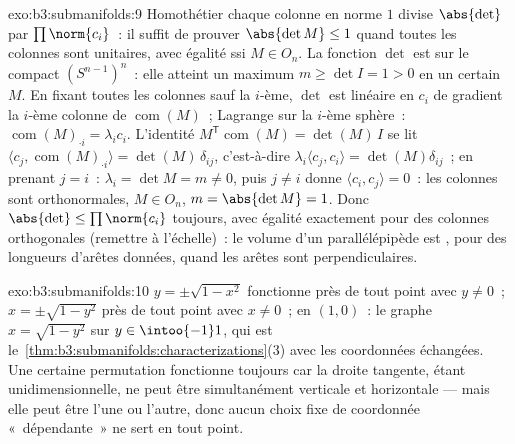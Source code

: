 \begin{solution}{exo:b3:submanifolds:9}
Homothétier chaque colonne en norme $1$ divise $\abs{\det}$
par $\prod\norm{c_i}$~: il suffit de prouver $\abs{\det M}
\leq 1$ quand toutes les colonnes sont unitaires, avec
égalité ssi $M \in O_n$. La fonction $\det$ est  sur
le compact $(S^{n-1})^n$~: elle atteint un maximum $m \geq
\det I = 1 > 0$ en un certain $M$. En fixant toutes les
colonnes sauf la $i$-ème, $\det$ est linéaire en $c_i$ de
gradient la $i$-ème colonne de $\operatorname{com}(M)$~;
Lagrange sur la $i$-ème sphère~:
$\operatorname{com}(M)_{\cdot i} = \lambda_i c_i$.
L'identité $M^{\mathsf T}\operatorname{com}(M) =
\det(M)\,I$ se lit $\langle c_j,
\operatorname{com}(M)_{\cdot i}\rangle =
\det(M)\,\delta_{ij}$, c'est-à-dire $\lambda_i\langle c_j,
c_i\rangle = \det(M)\delta_{ij}$~; en prenant $j = i$~:
$\lambda_i = \det M = m \neq 0$, puis $j \neq i$ donne
$\langle c_i, c_j\rangle = 0$~: les colonnes sont
orthonormales, $M \in O_n$, $m = \abs{\det M} = 1$. Donc
$\abs{\det} \leq \prod\norm{c_i}$ toujours, avec égalité
exactement pour des colonnes orthogonales (remettre à
l'échelle)~: le volume d'un parallélépipède est , pour
des longueurs d'arêtes données, quand les arêtes sont
perpendiculaires.
\end{solution}

\begin{solution}{exo:b3:submanifolds:10}
$y = \pm\sqrt{1 - x^2}$ fonctionne près de tout point avec
$y \neq 0$~; $x = \pm\sqrt{1 - y^2}$ près de tout point avec
$x \neq 0$~; en $(1, 0)$~: le graphe $x = \sqrt{1 - y^2}$
sur $y \in \intoo{-1}1$, qui est
le~\cref{thm:b3:submanifolds:characterizations}(3) avec les
coordonnées échangées. Une certaine permutation fonctionne
toujours car la droite tangente, étant unidimensionnelle, ne
peut être simultanément verticale et horizontale --- mais
elle peut être l'une ou l'autre, donc aucun choix fixe de
coordonnée «~dépendante~» ne sert en tout point.
\end{solution}

